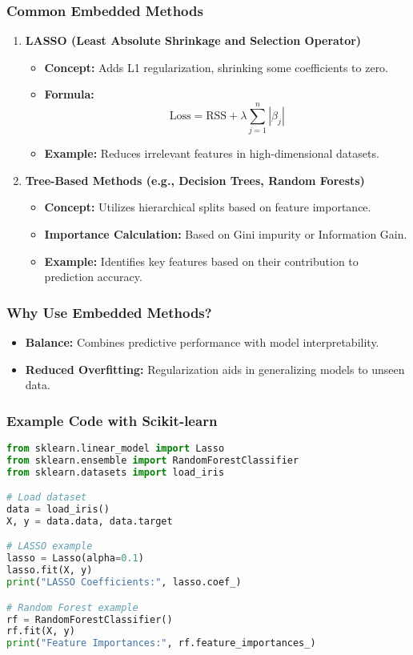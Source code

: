 \documentclass[aspectratio=169]{beamer}
\begin{document}
\begin{frame}[fragile]
    \frametitle{Common Embedded Methods}
    \begin{enumerate}
        \item \textbf{LASSO (Least Absolute Shrinkage and Selection Operator)}
            \begin{itemize}
                \item \textbf{Concept:} Adds L1 regularization, shrinking some coefficients to zero.
                \item \textbf{Formula:} 
                \begin{equation}
                    \text{Loss} = \text{RSS} + \lambda \sum_{j=1}^{n} |\beta_j|
                \end{equation}
                \item \textbf{Example:} Reduces irrelevant features in high-dimensional datasets.
            \end{itemize}
            
        \item \textbf{Tree-Based Methods (e.g., Decision Trees, Random Forests)}
            \begin{itemize}
                \item \textbf{Concept:} Utilizes hierarchical splits based on feature importance.
                \item \textbf{Importance Calculation:} Based on Gini impurity or Information Gain.
                \item \textbf{Example:} Identifies key features based on their contribution to prediction accuracy.
            \end{itemize}
    \end{enumerate}
\end{frame}

\begin{frame}[fragile]
    \frametitle{Why Use Embedded Methods?}
    \begin{itemize}
        \item \textbf{Balance:} Combines predictive performance with model interpretability.
        \item \textbf{Reduced Overfitting:} Regularization aids in generalizing models to unseen data.
    \end{itemize}
\end{frame}

\begin{frame}[fragile]
    \frametitle{Example Code with Scikit-learn}
    \begin{lstlisting}[language=Python]
from sklearn.linear_model import Lasso
from sklearn.ensemble import RandomForestClassifier
from sklearn.datasets import load_iris

# Load dataset
data = load_iris()
X, y = data.data, data.target

# LASSO example
lasso = Lasso(alpha=0.1)
lasso.fit(X, y)
print("LASSO Coefficients:", lasso.coef_)

# Random Forest example
rf = RandomForestClassifier()
rf.fit(X, y)
print("Feature Importances:", rf.feature_importances_)
    \end{lstlisting}
\end{frame}
\end{document}
